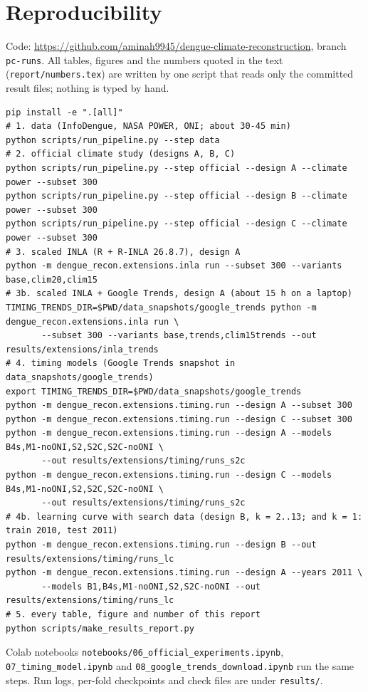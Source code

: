 \documentclass[11pt,a4paper]{article}
\begin{document}
\section{Reproducibility}\label{sec:repro}
Code: \url{https://github.com/aminah9945/dengue-climate-reconstruction}, branch \texttt{pc-runs}. All tables,
figures and the numbers quoted in the text (\texttt{report/numbers.tex}) are written by one script that reads only the
committed result files; nothing is typed by hand.
{\footnotesize
\begin{verbatim}
pip install -e ".[all]"
# 1. data (InfoDengue, NASA POWER, ONI; about 30-45 min)
python scripts/run_pipeline.py --step data
# 2. official climate study (designs A, B, C)
python scripts/run_pipeline.py --step official --design A --climate power --subset 300
python scripts/run_pipeline.py --step official --design B --climate power --subset 300
python scripts/run_pipeline.py --step official --design C --climate power --subset 300
# 3. scaled INLA (R + R-INLA 26.8.7), design A
python -m dengue_recon.extensions.inla run --subset 300 --variants base,clim20,clim15
# 3b. scaled INLA + Google Trends, design A (about 15 h on a laptop)
TIMING_TRENDS_DIR=$PWD/data_snapshots/google_trends python -m dengue_recon.extensions.inla run \
       --subset 300 --variants base,trends,clim15trends --out results/extensions/inla_trends
# 4. timing models (Google Trends snapshot in data_snapshots/google_trends)
export TIMING_TRENDS_DIR=$PWD/data_snapshots/google_trends
python -m dengue_recon.extensions.timing.run --design A --subset 300
python -m dengue_recon.extensions.timing.run --design C --subset 300
python -m dengue_recon.extensions.timing.run --design A --models B4s,M1-noONI,S2,S2C,S2C-noONI \
       --out results/extensions/timing/runs_s2c
python -m dengue_recon.extensions.timing.run --design C --models B4s,M1-noONI,S2,S2C,S2C-noONI \
       --out results/extensions/timing/runs_s2c
# 4b. learning curve with search data (design B, k = 2..13; and k = 1: train 2010, test 2011)
python -m dengue_recon.extensions.timing.run --design B --out results/extensions/timing/runs_lc
python -m dengue_recon.extensions.timing.run --design A --years 2011 \
       --models B1,B4s,M1-noONI,S2,S2C-noONI --out results/extensions/timing/runs_lc
# 5. every table, figure and number of this report
python scripts/make_results_report.py
\end{verbatim}
}
Colab notebooks \texttt{notebooks/06\_official\_experiments.ipynb}, \texttt{07\_timing\_model.ipynb} and
\texttt{08\_google\_trends\_download.ipynb} run the same steps. Run logs, per-fold checkpoints and check files are under
\texttt{results/}.
\end{document}
